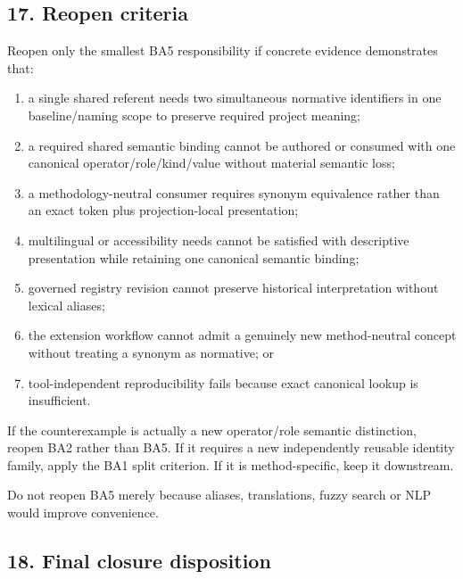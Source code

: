\documentclass[
  10pt,
  a4paper,
]{article}
\providecommand{\tightlist}{%
  \setlength{\itemsep}{0pt}\setlength{\parskip}{0pt}}
\begin{document}
\subsection{17. Reopen criteria}\label{17-reopen-criteria}

Reopen only the smallest BA5 responsibility if concrete evidence
demonstrates that:

\begin{enumerate}
\def\labelenumi{\arabic{enumi}.}
\tightlist
\item
  a single shared referent needs two simultaneous normative identifiers
  in one baseline/naming scope to preserve required project meaning;
\item
  a required shared semantic binding cannot be authored or consumed with
  one canonical operator/role/kind/value without material semantic loss;
\item
  a methodology-neutral consumer requires synonym equivalence rather
  than an exact token plus projection-local presentation;
\item
  multilingual or accessibility needs cannot be satisfied with
  descriptive presentation while retaining one canonical semantic
  binding;
\item
  governed registry revision cannot preserve historical interpretation
  without lexical aliases;
\item
  the extension workflow cannot admit a genuinely new method-neutral
  concept without treating a synonym as normative; or
\item
  tool-independent reproducibility fails because exact canonical lookup
  is insufficient.
\end{enumerate}

If the counterexample is actually a new operator/role semantic
distinction, reopen BA2 rather than BA5. If it requires a new
independently reusable identity family, apply the BA1 split criterion.
If it is method-specific, keep it downstream.

Do not reopen BA5 merely because aliases, translations, fuzzy search or
NLP would improve convenience.

\subsection{18. Final closure
disposition}\label{18-final-closure-disposition}
\end{document}
